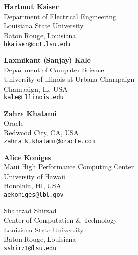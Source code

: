 \documentclass[12pt,letterpaper]{article}
\begin{document}
\begin{minipage}[t]{0.45\textwidth}
 \textbf{Hartmut Kaiser}\\
  Department of Electrical Engineering\\
  Louisiana State University\\
  Baton Rouge, Louisiana \\
  \texttt{hkaiser@cct.lsu.edu} 
\end{minipage}
\vspace{0.25cm}
\hfill
\begin{minipage}[t]{0.45\textwidth}
 \textbf{Laxmikant (Sanjay) Kale}\\
  Department of Computer Science\\
  University of Illinois at Urbana-Champaign\\
  Champaign, IL, USA \\
  \texttt{kale@illinois.edu}
\end{minipage}

\hspace{0.25cm}

\begin{minipage}[t]{0.45\textwidth}
\textbf{Zahra Khatami}\\
  Oracle\\
  Redwood City, CA, USA \\
  \texttt{zahra.k.khatami@oracle.com} 
\end{minipage}
\hfill
\begin{minipage}[t]{0.45\textwidth}
 \textbf{Alice Koniges}\\
  Maui High Performance Computing Center \\
  University of Hawaii\\
  Honolulu, HI, USA \\
  \texttt{aekoniges@lbl.gov}
\end{minipage}

\hspace{0.25cm}

\begin{minipage}[t]{0.45\textwidth}
 Shahrzad Shirzad\\
  Center of Computation \& Technology\\
  Louisiana State University\\
  Baton Rouge, Louisiana \\
  \texttt{sshirz1@lsu.edu}
\end{minipage}

\newpage
\end{document}
